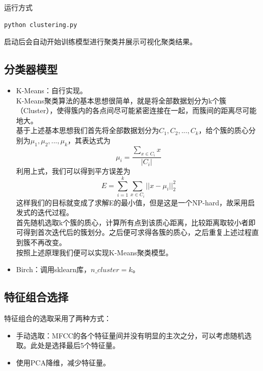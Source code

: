 \documentclass{acm_proc_article-sp}
\begin{document}
运行方式
\begin{lstlisting}
python clustering.py
\end{lstlisting}
启动后会自动开始训练模型进行聚类并展示可视化聚类结果。

\subsection{分类器模型}
\begin{itemize}
    \item K-Means：自行实现。\\
    K-Means聚类算法的基本思想很简单，就是将全部数据划分为k个簇（Cluster），使得簇内的各点间尽可能紧密连接在一起，而簇间的距离尽可能地大。\\
    基于上述基本思想我们首先将全部数据划分为$C_1, C_2,..., C_k$，给个簇的质心分别为$\mu_1, \mu_2,..., \mu_k$，其表达式为
    $$\mu_i = \frac{\sum\limits_{x \in C_i}x}{|C_i|}$$
    利用上式，我们可以得到平方误差为
    $$E=\sum\limits_{i=1}^{k}\sum\limits_{x \in C_i}||x - \mu_i||_2^2$$
    这样我们的目标就变成了求解E的最小值，但是这是一个NP-hard，故采用启发式的迭代过程。\\
    首先随机选取k个簇的质心，计算所有点到该质心距离，比较距离取较小者即可得到首次迭代后的簇划分。之后便可求得各簇的质心，之后重复上述过程直到簇不再改变。\\
    按照上述原理我们便可以实现K-Means聚类模型。
    \item Birch：调用sklearn库，$n\_cluster=k$。
\end{itemize}

\subsection{特征组合选择}
特征组合的选取采用了两种方式：
\begin{itemize}
    \item 手动选取：MFCC的各个特征量间并没有明显的主次之分，可以考虑随机选取。此处是选择最后5个特征量。
    \item 使用PCA降维，减少特征量。
\end{itemize}
\end{document}

